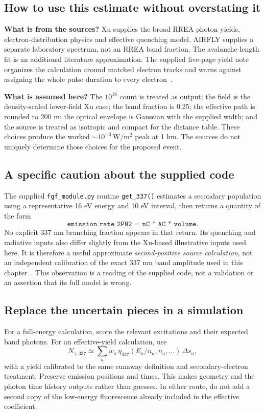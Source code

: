 \documentclass[11pt,a4paper]{article}
\begin{document}
\clearpage
\subsection{How to use this estimate without overstating it}
\label{sec:estimateuse}
\textbf{What is from the sources?} Xu supplies the broad RREA photon yields, electron-distribution physics and effective quenching model. AIRFLY supplies a separate laboratory spectrum, not an RREA band fraction. The avalanche-length fit is an additional literature approximation. The supplied five-page yield note organizes the calculation around matched electron tracks and warns against assigning the whole pulse duration to every electron~\cite{Xu2015,AIRFLY2007,Cramer2016,SuppliedYieldNote}.

\textbf{What is assumed here?} The $10^{16}$ count is treated as output; the field is the density-scaled lower-field Xu case; the band fraction is 0.25; the effective path is rounded to 200 m; the optical envelope is Gaussian with the supplied width; and the source is treated as isotropic and compact for the distance table. These choices produce the worked $\sim10^{-3}\,\mathrm{W/m^2}$ peak at 1 km. The sources do not uniquely determine those choices for the proposed event.

\subsection*{A specific caution about the supplied code}
The supplied \texttt{fgf\_module.py} routine \texttt{get\_337()} estimates a secondary population using a representative 16 eV energy and 10 eV interval, then returns a quantity of the form
\[
 \texttt{emission\_rate\_2PN2 = nC * AC * volume}.
\]
No explicit 337 nm branching fraction appears in that return. Its quenching and radiative inputs also differ slightly from the Xu-based illustrative inputs used here. It is therefore a useful approximate \emph{second-positive source calculation}, not an independent calibration of the exact 337 nm band amplitude used in this chapter~\cite{SuppliedCode}. This observation is a reading of the supplied code, not a validation or an assertion that its full model is wrong.

\subsection*{Replace the uncertain pieces in a simulation}
For a full-energy calculation, score the relevant excitations and their expected band photons. For an effective-yield calculation, use
\begin{equation}
 N_{\gamma,337}\simeq
 \sum_a w_a\,\eta_{337}(E_a/n_a,n_a,\ldots)\,\Delta s_a,
 \label{eq:localyield}
\end{equation}
with a yield calibrated to the same runaway definition and secondary-electron treatment. Preserve emission positions and times. This makes geometry and the photon time history outputs rather than guesses. In either route, do not add a second copy of the low-energy fluorescence already included in the effective coefficient.
\end{document}
